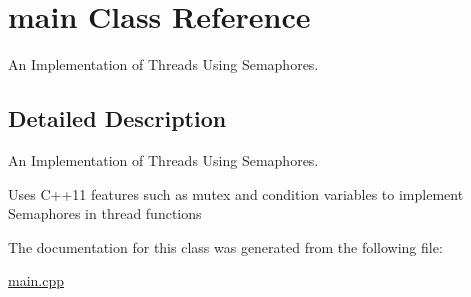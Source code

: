 \hypertarget{classmain}{}\section{main Class Reference}
\label{classmain}


An Implementation of Threads Using Semaphores.  




\subsection{Detailed Description}
An Implementation of Threads Using Semaphores. 

Uses C++11 features such as mutex and condition variables to implement Semaphores in thread functions 

The documentation for this class was generated from the following file\+:\begin{DoxyCompactItemize}
\item 
\hyperlink{main_8cpp}{main.\+cpp}\end{DoxyCompactItemize}
